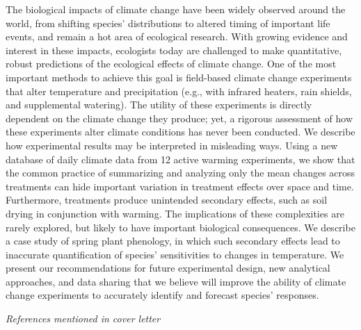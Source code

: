 \documentclass[12pt,a4paper]{letter}
\begin{document}
\begin{letter}{}
The biological impacts of climate change have been widely observed around the world, from shifting species' distributions to altered timing of important life events, and remain a hot area of ecological research. With growing evidence and interest in these impacts, ecologists today are challenged to make quantitative, robust predictions of the ecological effects of climate change. One of the most important methods to achieve this goal is field-based climate change experiments that alter temperature and precipitation (e.g., with infrared heaters, rain shields, and supplemental watering). The utility of these experiments is directly dependent on the climate change they produce; yet, a rigorous assessment of how these experiments alter climate conditions has never been conducted. We describe how experimental results may be interpreted in misleading ways. Using a new database of daily climate data from 12 active warming experiments, we show that the common practice of summarizing and analyzing only the mean changes across treatments can hide important variation in treatment effects over space and time. Furthermore, treatments produce unintended secondary effects, such as soil drying in conjunction with warming. The implications of these complexities are rarely explored, but likely to have important biological consequences. We describe a case study of spring plant phenology, in which such secondary effects lead to inaccurate quantification of species' sensitivities to changes in temperature. We present our recommendations for future experimental design, new analytical approaches, and data sharing that we believe will improve the ability of climate change experiments to accurately identify and forecast species' responses.


\noindent \emph{References mentioned in cover letter}

\begin{footnotesize}
{\def\section*#1{}

}
\end{footnotesize}

\end{letter}
\end{document}
